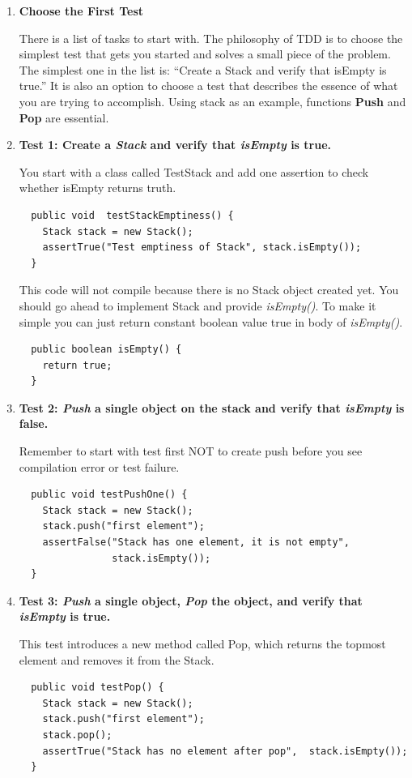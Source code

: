 \begin{enumerate}
\item \textbf{Choose the First Test}

There is a list of tasks to start with. The philosophy of TDD is to
choose the simplest test that gets you started and solves a small
piece of the problem. The simplest one in the list is: ``Create a
Stack and verify that isEmpty is true.'' It is also an option to
choose a test that describes the essence of what you are trying to
accomplish. Using stack as an example, functions \textbf{Push} and
\textbf{Pop} are essential.

\item \textbf{Test 1: Create a {\em Stack} and verify that {\em isEmpty} is true.}

You start with a class called TestStack and add one assertion to check
whether isEmpty returns truth.
{\small\begin{verbatim}
  public void  testStackEmptiness() {
    Stack stack = new Stack();
    assertTrue("Test emptiness of Stack", stack.isEmpty());	
  }
\end{verbatim}}

This code will not compile because there is no Stack object created
yet. You should go ahead to implement Stack and provide
\textit{isEmpty()}. To make it simple you can just return constant
boolean value true in body of \textit{isEmpty()}.
{\small\begin{verbatim}
  public boolean isEmpty() {
    return true;
  }
\end{verbatim}}

\item {\textbf{Test 2: {\em Push} a single object on the stack and verify that {\em isEmpty} is false.}}

Remember to start with test first NOT to create push before you see
compilation error or test failure.
{\small\begin{verbatim}
  public void testPushOne() {	
    Stack stack = new Stack();
    stack.push("first element");
    assertFalse("Stack has one element, it is not empty", 
                stack.isEmpty());
  }
\end{verbatim}}

\item {\textbf{Test 3: {\em Push} a single object, {\em Pop} the object, and verify that {\em isEmpty} is true.}}

This test introduces a new method called Pop, which returns the
topmost element and removes it from the Stack.

{\small\begin{verbatim}
  public void testPop() {	
    Stack stack = new Stack();
    stack.push("first element");
    stack.pop();
    assertTrue("Stack has no element after pop",  stack.isEmpty());
  }
\end{verbatim}}


\end{enumerate}
